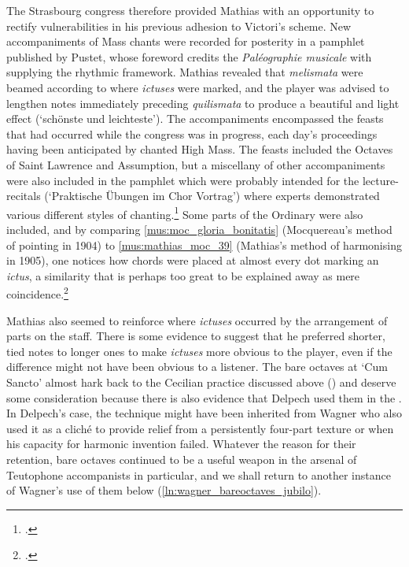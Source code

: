 The Strasbourg congress therefore provided Mathias with an opportunity to rectify vulnerabilities in his previous adhesion to Victori's scheme.
New accompaniments of Mass chants were recorded for posterity in a pamphlet published by Pustet, whose foreword credits the \emph{Paléographie musicale} with supplying the rhythmic framework.
Mathias revealed that \emph{melismata} were beamed according to where \emph{ictuses} were marked, and the player was advised to lengthen notes immediately preceding \emph{quilismata} to produce a beautiful and light effect (`schönste und leichteste').
The accompaniments encompassed the feasts that had occurred while the congress was in progress, each day's proceedings having been anticipated by chanted High Mass.
The feasts included the Octaves of Saint Lawrence and Assumption, but a miscellany of other accompaniments were also included in the pamphlet which were probably intended for the lecture-recitals (`Praktische Übungen im Chor Vortrag') where experts demonstrated various different styles of chanting.\footcite[11]{VogeleisFestschriftInternationalenKongress1905}
Some parts of the Ordinary were also included, and by comparing \cref{mus:moc_gloria_bonitatis} (Mocquereau's method of pointing in 1904) to \cref{mus:mathias_moc_39} (Mathias's method of harmonising in 1905), one notices how chords were placed at almost every dot marking an \emph{ictus}, a similarity that is perhaps too great to be explained away as mere coincidence.\footcites[unpaginated `Vorwort', pp.~3, 39]{MathiasOrgelbegleitungfuerInternationalen1905}[12]{KyrialeseuOrdinarium1904}

Mathias also seemed to reinforce where \emph{ictuses} occurred by the arrangement of parts on the staff.
There is some evidence to suggest that he preferred shorter, tied notes to longer ones to make \emph{ictuses} more obvious to the player, even if the difference might not have been obvious to a listener.
The bare octaves at `Cum Sancto' almost hark back to the Cecilian practice discussed above () and deserve some consideration because there is also evidence that Delpech used them in the \ldo{}.
In Delpech's case, the technique might have been inherited from Wagner who also used it as a cliché to provide relief from a persistently four-part texture or when his capacity for harmonic invention failed.
Whatever the reason for their retention, bare octaves continued to be a useful weapon in the arsenal of Teutophone accompanists in particular, and we shall return to another instance of Wagner's use of them below (\cref{ln:wagner_bareoctaves_jubilo}).

